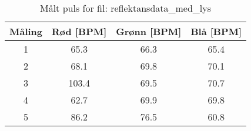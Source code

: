 
\begin{table}[H]
\centering
\caption{Målt puls for fil: reflektansdata\_med\_lys}
\label{tab:reflektansdata\_med\_lys}
\begin{tabular}{|c|c|c|c|}
\hline
\textbf{Måling} & \textbf{Rød [BPM]} & \textbf{Grønn [BPM]} & \textbf{Blå [BPM]} \\ \hline
1 & 65.3 & 66.3 & 65.4 \\ \hline
2 & 68.1 & 69.8 & 70.1 \\ \hline
3 & 103.4 & 69.5 & 70.7 \\ \hline
4 & 62.7 & 69.9 & 69.8 \\ \hline
5 & 86.2 & 76.5 & 60.8 \\ \hline
\end{tabular}
\end{table}
